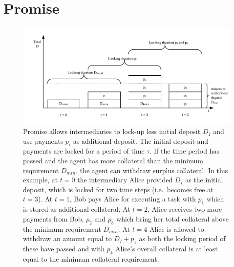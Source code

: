 \documentclass[runningheads]{llncs}
\newcommand{\sys}{Promise\xspace}
\newcommand{\discount}{\sum_{t=0}^{T} \big( \frac{\delta}{1+r} \big)^t}
\newcommand{\dom}[1]{\todo[linecolor=green,backgroundcolor=green!25,bordercolor=green,inline,caption={}]{Comment by Dominik: #1}}
\begin{document}







\section{Promise}
\label{sec:promise}

\begin{figure}
    \centering
    \includegraphics[width=\textwidth]{promise/figures/Promise.pdf}
    \caption{\sys allows intermediaries to lock-up less initial deposit $D_I$ and use payments $p_i$ as additional deposit. The initial deposit and payments are locked for a period of time $\tau$. If the time period has passed and the agent has more collateral than the minimum requirement $D_{min}$, the agent can withdraw surplus collateral. In this example, at $t=0$ the intermediary Alice provided $D_I$ as the initial deposit, which is locked for two time steps (i.e.\ becomes free at $t=3$). At $t=1$, Bob pays Alice for executing a task with $p_1$ which is stored as additional collateral. At $t=2$, Alice receives two more payments from Bob, $p_2$ and $p_3$ which bring her total collateral above the minimum requirement $D_{min}$. At $t=4$ Alice is allowed to withdraw an amount equal to $D_I + p_1$ as both the locking period of these have passed and with $p_4$ Alice's overall collateral is at least equal to the minimum collateral requirement.}
    \label{fig:promise}
\end{figure}
\end{document}
